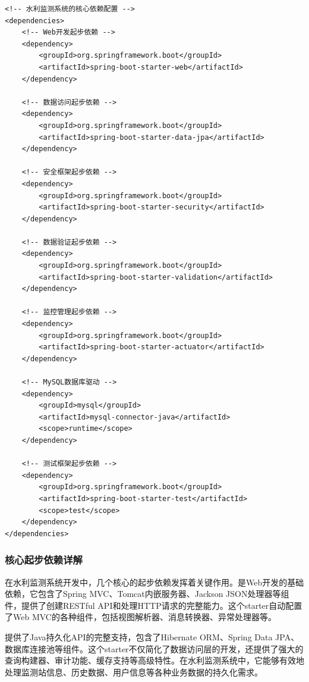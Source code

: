\begin{lstlisting}[style=xml]
<!-- 水利监测系统的核心依赖配置 -->
<dependencies>
    <!-- Web开发起步依赖 -->
    <dependency>
        <groupId>org.springframework.boot</groupId>
        <artifactId>spring-boot-starter-web</artifactId>
    </dependency>
    
    <!-- 数据访问起步依赖 -->
    <dependency>
        <groupId>org.springframework.boot</groupId>
        <artifactId>spring-boot-starter-data-jpa</artifactId>
    </dependency>
    
    <!-- 安全框架起步依赖 -->
    <dependency>
        <groupId>org.springframework.boot</groupId>
        <artifactId>spring-boot-starter-security</artifactId>
    </dependency>
    
    <!-- 数据验证起步依赖 -->
    <dependency>
        <groupId>org.springframework.boot</groupId>
        <artifactId>spring-boot-starter-validation</artifactId>
    </dependency>
    
    <!-- 监控管理起步依赖 -->
    <dependency>
        <groupId>org.springframework.boot</groupId>
        <artifactId>spring-boot-starter-actuator</artifactId>
    </dependency>
    
    <!-- MySQL数据库驱动 -->
    <dependency>
        <groupId>mysql</groupId>
        <artifactId>mysql-connector-java</artifactId>
        <scope>runtime</scope>
    </dependency>
    
    <!-- 测试框架起步依赖 -->
    <dependency>
        <groupId>org.springframework.boot</groupId>
        <artifactId>spring-boot-starter-test</artifactId>
        <scope>test</scope>
    </dependency>
</dependencies>
\end{lstlisting}

\hypertarget{ux6838ux5fc3ux8d77ux6b65ux4f9dux8d56ux8be6ux89e3}{%
\subsubsection{核心起步依赖详解}\label{ux6838ux5fc3ux8d77ux6b65ux4f9dux8d56ux8be6ux89e3}}

在水利监测系统开发中，几个核心的起步依赖发挥着关键作用。是Web开发的基础依赖，它包含了Spring MVC、Tomcat内嵌服务器、Jackson JSON处理器等组件，提供了创建RESTful API和处理HTTP请求的完整能力。这个starter自动配置了Web MVC的各种组件，包括视图解析器、消息转换器、异常处理器等。

提供了Java持久化API的完整支持，包含了Hibernate ORM、Spring Data JPA、数据库连接池等组件。这个starter不仅简化了数据访问层的开发，还提供了强大的查询构建器、审计功能、缓存支持等高级特性。在水利监测系统中，它能够有效地处理监测站信息、历史数据、用户信息等各种业务数据的持久化需求。

